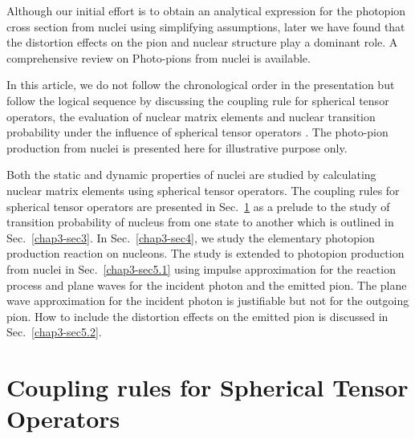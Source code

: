 Although our initial effort is to obtain an analytical expression for the photopion cross section from nuclei using simplifying assumptions, later we have found that the distortion effects on the pion and nuclear structure play a dominant role. A comprehensive review \cite{chap3-key22} on Photo-pions from nuclei is available. 

In this article, we do not follow the chronological order in the presentation but follow the logical sequence by discussing the coupling rule for spherical tensor operators, the evaluation of nuclear matrix elements and nuclear transition probability under the influence of spherical tensor operators \cite{chap3-key12}. The photo-pion production from nuclei is presented here for illustrative purpose only.

Both the static and dynamic properties of nuclei are studied by calculating nuclear matrix elements using spherical tensor operators. The coupling rules for spherical tensor operators are presented in Sec.\ \ref{chap3-sec2} as a prelude to the study of transition probability of nucleus from one state to another which is outlined in Sec.\ \ref{chap3-sec3}. In Sec.\ \ref{chap3-sec4}, we study the elementary photopion production reaction on nucleons. The study is extended to photopion production from nuclei in Sec.\ \ref{chap3-sec5.1} using impulse approximation for the reaction process and plane waves for the incident photon and the emitted pion. The plane wave approximation for the incident photon is justifiable but not for the outgoing pion. How to include the distortion effects on the emitted pion is discussed in Sec.\ \ref{chap3-sec5.2}.

\section{Coupling rules for Spherical Tensor Operators} \label{chap3-sec2}

